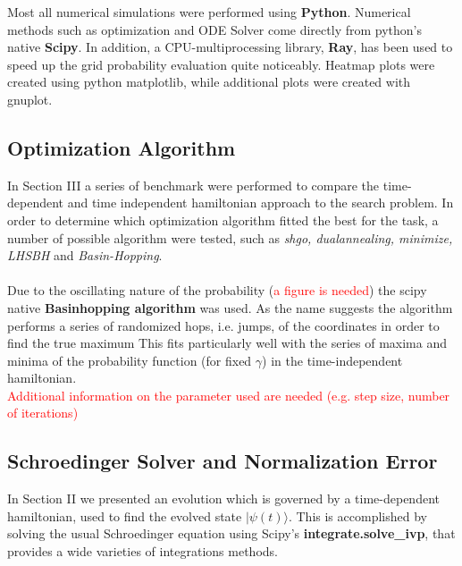 \documentclass[aps,pra,reprint, onecolumn]{revtex4-2}
\newcommand{\red}[1]{\textcolor{red}{#1}}
\begin{document}
Most all numerical simulations were performed using \textbf{Python}. Numerical methods such as optimization and ODE Solver come directly from python's native \textbf{Scipy}. In addition, a CPU-multiprocessing library, \textbf{Ray}, has been used to speed up the grid probability evaluation quite noticeably. Heatmap plots were created using python matplotlib, while additional plots were created with gnuplot.

\subsection{Optimization Algorithm}
In Section III a series of benchmark were performed to compare the time-dependent and time independent hamiltonian approach to the search problem. In order to determine which optimization algorithm fitted the best for the task, a number of possible algorithm were tested, such as \textit{shgo, dualannealing, minimize, LHSBH} and \textit{Basin-Hopping}.\\ \\
Due to the oscillating nature of the probability (\red{a figure is needed}) the scipy native \textbf{Basinhopping algorithm} was used. As the name suggests the algorithm performs a series of randomized hops, i.e. jumps, of the coordinates in order to find the true maximum This fits particularly well with the series of maxima and minima of the probability function (for fixed $\gamma$) in the time-independent hamiltonian. \\\red{Additional information on the parameter used are needed (e.g. step size, number of iterations)} 


\subsection{Schroedinger Solver and Normalization Error}
In Section II we presented an evolution which is governed by a time-dependent hamiltonian, used to find the evolved state $|\psi(t)\rangle$. This is accomplished by solving the usual Schroedinger equation using Scipy's \textbf{integrate.solve\_ivp}, that provides a wide varieties of integrations methods. \\
\end{document}
